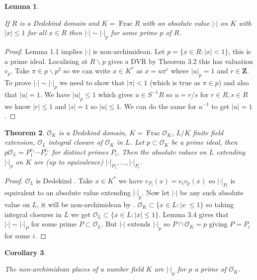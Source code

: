 \documentclass[10pt,]{book}
\newcommand{\lt}{<}
\theoremstyle{plain}
\newtheorem{theorem}{Theorem}[section]
\newtheorem{corollary}[theorem]{Corollary}
\newtheorem{lemma}[theorem]{Lemma}
\theoremstyle{definition}
\newcommand{\ZZ}{\mathbf{Z}}
\newcommand{\cO}{\mathcal{O}}
\newcommand{\ab}{|\cdot|}
\DeclareMathOperator{\Frac}{Frac}
\begin{document}
\begin{lemma}\label{lemma-13}

            If \(R\) is a Dedekind domain and \(K = \Frac R\) with an absolute value \(\ab\) on \(K\) with \(|x| \le 1 \) for all \(x\in R\) then \(\ab \sim \ab_p\) for some prime \(p\) of \(R\).
          \end{lemma}
\begin{proof}

            Lemma 1.1  implies \(\ab\) is non-archimidean.
            Let \(p = \{x\in R : |x| \lt 1\}\), this is a prime ideal.
            Localising at \(R\smallsetminus p\) gives a DVR by Theorem 3.2  this has valuation \(v_p\).
            Take \(\pi \in p \smallsetminus p^2 \) so we can write \(x \in K^*\) as \(x= u\pi^r\) where \(|u|_p = 1\) and \(r\in \ZZ\).
            To prove \(\ab\sim\ab_p\) we need to show that \(|\pi| \lt 1\) (which is true as \(\pi \in p\)) and also that \(|u| = 1\).
            We have \(|u|_p \le 1\) which gives \(u \in S^{-1}R\) so \(u = r/s\) for \(r\in R, s\in R\) we know \(|r| \le 1\) and \(|s| = 1\) so \(|u| \le 1\).
            We can do the same for \(u^{-1}\) to get \(|u| = 1\).
          \end{proof}
\begin{theorem}\label{theorem-6}
\(\cO_K\) is a Dedekind domain, \(K = \Frac\cO_K\), \(L/K\) finite field extension, \(\cO_L\) integral closure of \(\cO_K\) in \(L\).
            Let \(p \subset \cO_K\) be a prime ideal, then \(p \cO_L = P_1^{e_1} \cdots P_r^{e_r}\) for distinct primes \(P_i\).
            Then the absolute values on \(L\) extending \(\ab_p\) on \(K\) are (up to equivalence) \(\ab_{P_1},\ldots,\ab_{P_r}\).
          \end{theorem}
\begin{proof}
\(\cO_L\) is Dedekind .
            Take \(x \in K^*\) we have \(v_{P_i}(x) = e_i v_p(x)\) so \(\ab_{P_i}\) is equivalent to an absolute value extending \(\ab_p\).
            Now let \(\ab\) be any such absolute value on \(L\), it will be non-archimidean by .
            \(\cO_K \subset \{x\in L : |x\ \le 1\}\) so taking integral closures in \(L\) we get \(\cO_L \subset \{x\in L : |x| \le 1\}\).
            Lemma 3.4  gives that \(\ab\sim \ab_P\) for some prime \(P\subset \cO_L\).
            But \(\ab\) extends \(\ab_p\) so \(P \cap \cO_K = p\) giving \(P = P_i\) for some  \(i\).
          \end{proof}
\begin{corollary}\label{corollary-4}

            The non-archimidean places of a number field \(K\) are \(\ab_p\) for \(p\) a prime of \(\cO_K\).
          \end{corollary}
\typeout{************************************************}
\typeout{************************************************}
\end{document}
